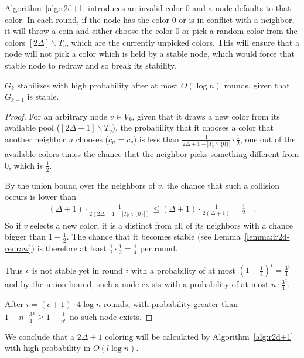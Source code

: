 Algorithm~\ref{alg:r2d+1} introduces an invalid color $0$ and a node defaults to that color. In each round, if the node has the color $0$ or is in conflict with a neighbor, it will throw a coin and either choose the color $0$ or pick a random color from the colors $[2\Delta]\backslash T_v$, which are the currently unpicked colors. This will ensure that a node will not pick a color which is held by a stable node, which would force that stable node to redraw and so break its stability.


\begin{lemma}$G_k$ stabilizes with high probability after at most $O(\log n)$ rounds, given that $G_{k-1}$ is stable.
\end{lemma}
\begin{proof}
	For an arbitrary node $v \in V_k$, given that it draws a new color from its available pool ($[2\Delta+1] \backslash T_v$), the probability that it chooses a color that another neighbor $u$ chooses ($c_u = c_v$) is less than $\frac{1}{2\Delta+1- |T_v \backslash\{0\}|} \cdot \frac{1}{2}$, one out of the available colors times the chance that the neighbor picks something different from $0$, which is $\frac{1}{2}$.
	
	By the union bound over the neighbors of $v$, the chance that such a collision occurs is lower than
\begin{align*}
	(\Delta+1) \cdot \frac{1}{2 (2\Delta+1-|T_v \backslash\{0\}|)}\leq (\Delta+1) \cdot \frac{1}{2 (\Delta+1)} = \frac{1}{2}\hspace{1em}.
\end{align*}
	So if $v$ selects a new color, it is a distinct from all of its neighbors with a chance bigger than $1-\frac{1}{2}$. The chance that it becomes stable (see Lemma~\ref{lemma:ir2d-redraw}) is therefore at least $\frac{1}{2} \cdot \frac{1}{2} = \frac{1}{4}$ per round.
	
	Thus $v$ is not stable yet in round $i$ with a probability of at most $(1-\frac{1}{4})^i = \frac{3}{4}^i$ and by the union bound, such a node exists with a probability of at most $n \cdot \frac{3}{4}^i$.
	
	After $i = (c+1)\cdot 4\log n$ rounds, with probability greater than $1 - n \cdot \frac{3}{4}^i \geq 1-\frac{1}{n^c}$ no such node exists.
\end{proof}

\begin{theorem}
We conclude that a $2\Delta+1$ coloring will be calculated by Algorithm~\ref{alg:r2d+1} with high probability in $O(l \log n)$.
\end{theorem}


